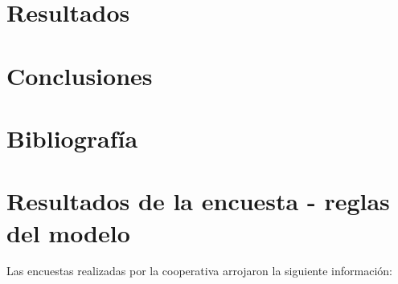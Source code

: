 \documentclass{article}
\begin{document}
\section{Resultados}

\section{Conclusiones}

\section{Bibliografía}


\pagebreak
\section*{Resultados de la encuesta - reglas del modelo}

Las encuestas realizadas por la cooperativa arrojaron la siguiente información:
\end{document}

